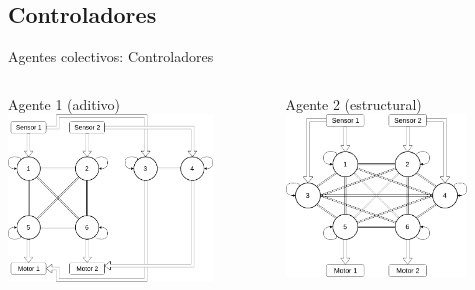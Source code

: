 \documentclass[aspectratio=169]{beamer}
\begin{document}
\subsection{Controladores}
\begin{frame}{Agentes colectivos: Controladores}
  \begin{columns}
    \begin{column}{0.5\textwidth}
      \begin{block}{Agente 1 (aditivo)}
        \vspace{0.5cm}
      \includegraphics[width=0.8\textwidth,height=.50\textheight]{Imagenes/Agent1Controller}
    \end{block}
    \end{column}
    \begin{column}{0.5\textwidth}
      \begin{block}{Agente 2 (estructural)}
        \vspace{0.5cm}
      \includegraphics[width=0.8\textwidth,height=.50\textheight]{Imagenes/Agent2Controller}
      \end{block}
    \end{column}
  \end{columns}
\end{frame}
\end{document}

